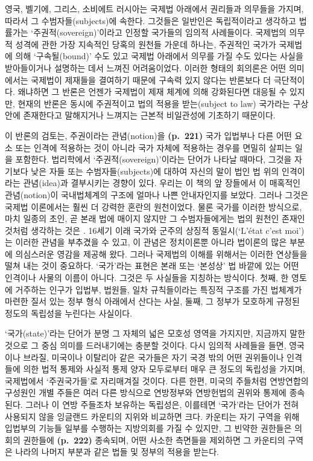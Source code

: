 영국, 벨기에, 그리스, 소비에트 러시아는 국제법 아래에서 권리들과
의무들을 가지며, 따라서 그 수범자들(subjects)에 속한다. 그것들은
일반인은 독립적이라고 생각하고 법률가는 ‘주권적(sovereign)’이라고 인정할
국가들의 임의적 사례들이다. 국제법의 의무적 성격에 관한 가장 지속적인
당혹의 원천들 가운데 하나는, 주권적인 국가가 국제법에 의해
‘구속될(bound)’ 수도 있고 국제법 아래에서 의무를 가질 수도 있다는 사실을
받아들이거나 설명하는 데서 느껴진 어려움이었다. 이러한 형태의 회의론은
어떤 의미에서는 국제법이 제재들을 결여하기 때문에 구속력 있지 않다는
반론보다 더 극단적이다. 왜냐하면 그 반론은 언젠가 국제법이 제재 체계에
의해 강화된다면 대응될 수 있지만, 현재의 반론은 동시에 주권적이고 법의
적용을 받는(subject to law) 국가라는 구상 안에 존재한다고 말해지거나
느껴지는 근본적 비일관성에 기초하기 때문이다.

이 반론의 검토는, 주권이라는 관념(notion)을 \textbf{(p.~221)} 국가
 입법부나 다른 어떤 요소 또는 인격에 적용하는 것이
아니라 국가 자체에 적용하는 경우를 면밀히 살피는 일을 포함한다.
법리학에서 ‘주권적(sovereign)’이라는 단어가 나타날 때마다, 그것을
자기보다 낮은 자들 또는 수범자들(subjects)에 대하여 자신의 말이 법인 법
위의 인격이라는 관념(idea)과 결부시키는 경향이 있다. 우리는 이 책의 앞
장들에서 이 매혹적인 관념(notion)이 국내법체계의 구조에 얼마나 나쁜
안내자인지를 보았다. 그러나 그것은 국제법 이론에서는 훨씬 더 강력한
혼란의 원천이었다. 물론 국가를 이러한 방식으로, 마치 일종의 초인, 곧
본래 법에 매이지 않지만 그 수범자들에게는 법의 원천인 존재인 것처럼
생각하는 것은 . 16세기 이래 국가와 군주의 상징적
동일시(`L'état c'est moi')는 이러한 관념을 부추겼을 수 있고, 이 관념은
정치이론뿐 아니라 법이론의 많은 부분에 의심스러운 영감을 제공해 왔다.
그러나 국제법의 이해를 위해서는 이러한 연상들을 떨쳐 내는 것이 중요하다.
‘국가’라는 표현은 본래 또는 ‘본성상’ 법 바깥에 있는 어떤 인격이나 사물의
이름이 아니다. 그것은 두 사실들을 지칭하는 방식이다. 첫째, 한 영토에
거주하는 인구가 입법부, 법원들, 일차 규칙들이라는 특징적 구조를 가진
법체계가 마련한 질서 있는 정부 형식 아래에서 산다는 사실, 둘째, 그
정부가 모호하게 규정된 정도의 독립성을 누린다는 사실이다.

‘국가(state)’라는 단어가 분명 그 자체의 넓은 모호성 영역을 가지지만,
지금까지 말한 것으로 그 중심 의미를 드러내기에는 충분할 것이다. 다시
임의적 사례들을 들면, 영국이나 브라질, 미국이나 이탈리아 같은 국가들은
자기 국경 밖의 어떤 권위들이나 인격들에 의한 법적 통제와 사실적 통제
양자 모두로부터 매우 큰 정도의 독립성을 가지며, 국제법에서
‘주권국가들’로 자리매겨질 것이다. 다른 한편, 미국의 주들처럼 연방연합의
구성원인 개별 주들은 여러 다른 방식으로 연방정부와 연방헌법의 권위와
통제에 종속된다. 그러나 이 연방 주들조차 보유하는 독립성은, 이를테면
‘국가’라는 단어가 전혀 사용되지 않을 잉글랜드 카운티의 지위와 비교하면
크다. 카운티는 자기 구역을 위해 입법부의 기능들 일부를 수행하는
지방의회를 가질 수 있지만, 그 빈약한 권한들은 의회의 권한들에
\textbf{(p.~222)} 종속되며, 어떤 사소한 측면들을 제외하면 그 카운티의
구역은 나라의 나머지 부분과 같은 법들 및 정부의 적용을 받는다.

